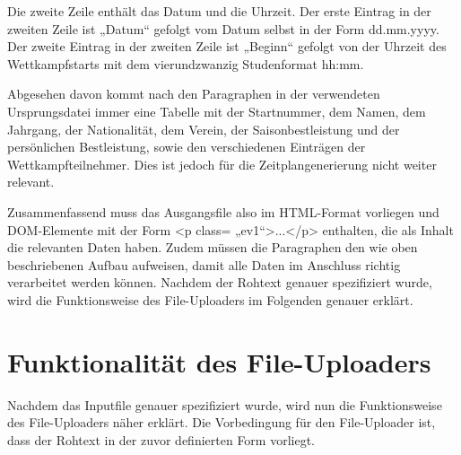 {Die zweite Zeile enthält das Datum und die Uhrzeit. Der erste Eintrag in der zweiten Zeile ist „Datum“ gefolgt vom Datum selbst in der Form dd.mm.yyyy. Der zweite Eintrag in der zweiten Zeile ist „Beginn“ gefolgt von der Uhrzeit des Wettkampfstarts mit dem vierundzwanzig Studenformat hh:mm.

Abgesehen davon kommt nach den Paragraphen in der verwendeten Ursprungsdatei immer eine Tabelle mit der Startnummer, dem Namen, dem Jahrgang, der Nationalität, dem Verein, der Saisonbestleistung und der persönlichen Bestleistung, sowie den verschiedenen Einträgen der Wettkampfteilnehmer. Dies ist jedoch für die Zeitplangenerierung nicht weiter relevant.

Zusammenfassend muss das Ausgangsfile also im HTML-Format vorliegen und DOM-Elemente mit der Form <p class= „ev1“>...</p> enthalten, die als Inhalt die relevanten Daten haben. Zudem müssen die Paragraphen den wie oben beschriebenen Aufbau aufweisen, damit alle Daten im Anschluss richtig verarbeitet werden können. 
Nachdem der Rohtext genauer spezifiziert wurde, wird die Funktionsweise des File-Uploaders im Folgenden genauer erklärt.

\section{Funktionalität des File-Uploaders}
Nachdem das Inputfile genauer spezifiziert wurde, wird nun die Funktionsweise des File-Uploaders näher erklärt. Die Vorbedingung für den File-Uploader ist, dass der Rohtext in der zuvor definierten Form vorliegt.

}
